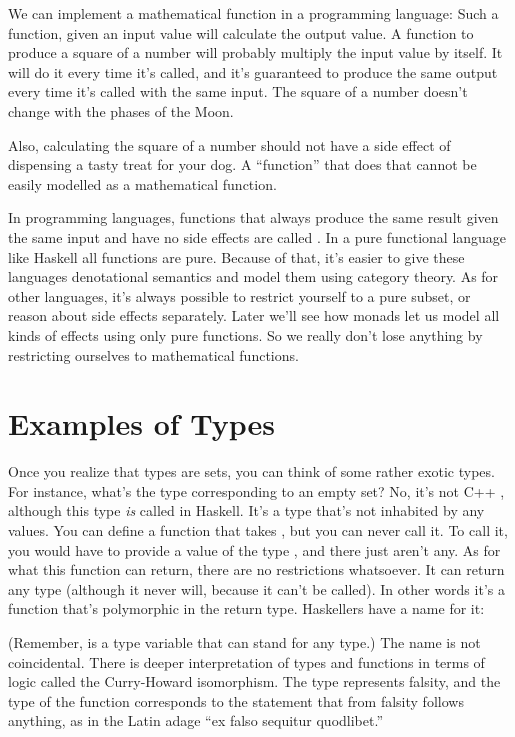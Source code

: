 We can implement a mathematical function in a programming language: Such
a function, given an input value will calculate the output value. A
function to produce a square of a number will probably multiply the
input value by itself. It will do it every time it's called, and it's
guaranteed to produce the same output every time it's called with the
same input. The square of a number doesn't change with the phases of the
Moon.

Also, calculating the square of a number should not have a side effect
of dispensing a tasty treat for your dog. A ``function'' that does that
cannot be easily modelled as a mathematical function.

In programming languages, functions that always produce the same result
given the same input and have no side effects are called . In a pure functional language like Haskell all functions are
pure. Because of that, it's easier to give these languages denotational
semantics and model them using category theory. As for other languages,
it's always possible to restrict yourself to a pure subset, or reason
about side effects separately. Later we'll see how monads let us model
all kinds of effects using only pure functions. So we really don't lose
anything by restricting ourselves to mathematical functions.

\section{Examples of Types}

Once you realize that types are sets, you can think of some rather
exotic types. For instance, what's the type corresponding to an empty
set? No, it's not C++ , although this type \emph{is} called
 in Haskell. It's a type that's not inhabited by any
values. You can define a function that takes , but you can
never call it. To call it, you would have to provide a value of the type
, and there just aren't any. As for what this function can
return, there are no restrictions whatsoever. It can return any type
(although it never will, because it can't be called). In other words
it's a function that's polymorphic in the return type. Haskellers have a
name for it:

(Remember,  is a type variable that can stand for any type.)
The name is not coincidental. There is deeper interpretation of types
and functions in terms of logic called the Curry-Howard isomorphism. The
type  represents falsity, and the type of the function
 corresponds to the statement that from falsity follows
anything, as in the Latin adage ``ex falso sequitur quodlibet.''

